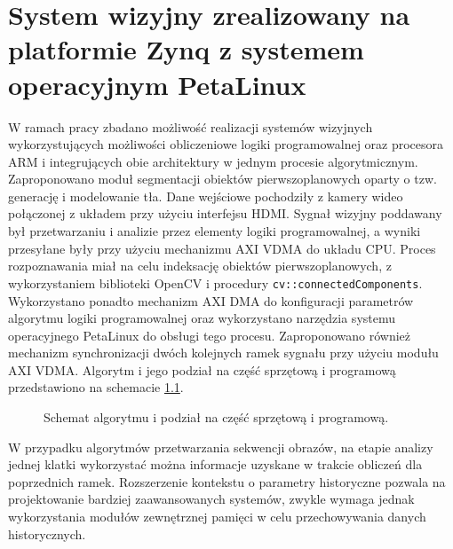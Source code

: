 \chapter{System wizyjny zrealizowany na platformie Zynq z systemem operacyjnym PetaLinux}
\label{cha:project}


W ramach pracy zbadano możliwość realizacji systemów wizyjnych wykorzystujących możliwości obliczeniowe logiki programowalnej oraz procesora ARM i integrujących obie architektury w jednym procesie algorytmicznym. 
Zaproponowano moduł segmentacji obiektów pierwszoplanowych oparty o tzw. generację i modelowanie tła. 
Dane wejściowe pochodziły z kamery wideo połączonej z układem przy użyciu interfejsu HDMI. 
Sygnał wizyjny poddawany był przetwarzaniu i analizie przez elementy logiki programowalnej, a wyniki przesyłane były przy użyciu mechanizmu AXI VDMA do układu CPU. 
Proces rozpoznawania miał na celu indeksację obiektów pierwszoplanowych, z wykorzystaniem biblioteki OpenCV i procedury \texttt{cv::connectedComponents}. 
Wykorzystano ponadto mechanizm AXI DMA do konfiguracji parametrów algorytmu logiki programowalnej oraz wykorzystano narzędzia systemu operacyjnego PetaLinux do obsługi tego procesu. 
Zaproponowano również mechanizm synchronizacji dwóch kolejnych ramek sygnału przy użyciu modułu AXI VDMA.
Algorytm i jego podział na część sprzętową i programową przedstawiono na schemacie \ref{fig:full-algo}.

\begin{figure}[h]
	\centering
	\def\svgwidth{\textwidth}
	
	\caption{Schemat algorytmu i podział na część sprzętową i programową.}
	\label{fig:full-algo}
\end{figure}

W przypadku algorytmów przetwarzania sekwencji obrazów, na etapie analizy jednej klatki wykorzystać można informacje uzyskane w trakcie obliczeń dla poprzednich ramek. 
Rozszerzenie kontekstu o parametry historyczne pozwala na projektowanie bardziej zaawansowanych systemów, zwykle wymaga jednak wykorzystania modułów zewnętrznej pamięci w celu przechowywania danych historycznych.

